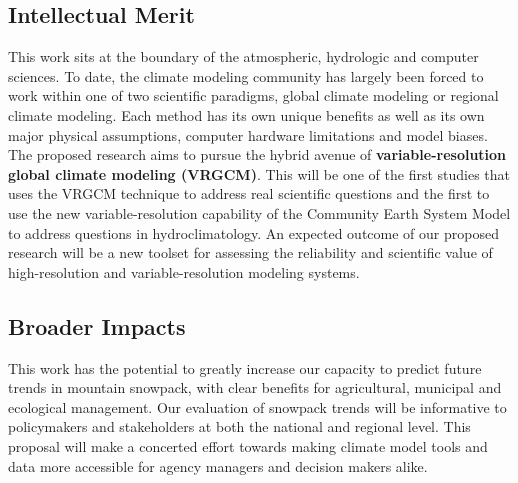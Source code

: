 \documentclass[11pt]{article}
\begin{document}
\vspace{-0.7cm}
\subsection*{Intellectual Merit}
\vspace{-0.5cm}

This work sits at the boundary of the atmospheric, hydrologic and computer sciences.  To date, the climate modeling community has largely been forced to work within one of two scientific paradigms, global climate modeling or regional climate modeling.  Each method has its own unique benefits as well as its own major physical assumptions, computer hardware limitations and model biases.  The proposed research aims to pursue the hybrid avenue of \textbf{variable-resolution global climate modeling (VRGCM)}.  This will be one of the first studies that uses the VRGCM technique to address real scientific questions and the first to use the new variable-resolution capability of the Community Earth System Model to address questions in hydroclimatology.  An expected outcome of our proposed research will be a new toolset for assessing the reliability and scientific value of high-resolution and variable-resolution modeling systems. 


\vspace{-0.7cm}
\subsection*{Broader Impacts}
\vspace{-0.5cm}

This work has the potential to greatly increase our capacity to predict future trends in mountain snowpack, with clear benefits for agricultural, municipal and ecological management.  Our evaluation of snowpack trends will be informative to policymakers and stakeholders at both the national and regional level.  This proposal will make a concerted effort towards making climate model tools and data more accessible for agency managers and decision makers alike.
\end{document}
